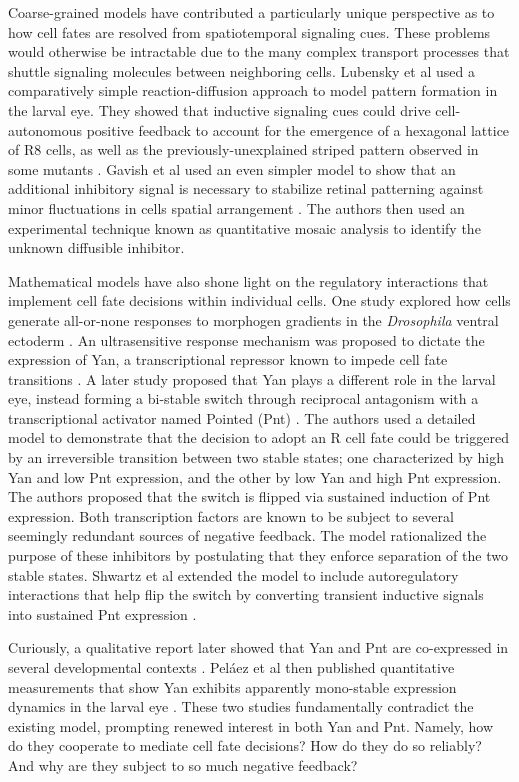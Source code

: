 Coarse-grained models have contributed a particularly unique perspective as to how cell fates are resolved from spatiotemporal signaling cues. These problems would otherwise be intractable due to the many complex transport processes that shuttle signaling molecules between neighboring cells. Lubensky et al used a comparatively simple reaction-diffusion approach to model pattern formation in the larval eye. They showed that inductive signaling cues could drive cell-autonomous positive feedback to account for the emergence of a hexagonal lattice of R8 cells, as well as the previously-unexplained striped pattern observed in some mutants \cite{Lubensky2011}. Gavish et al used an even simpler model to show that an additional inhibitory signal is necessary to stabilize retinal patterning against minor fluctuations in cells spatial arrangement \cite{Gavish2016}. The authors then used an experimental technique known as quantitative mosaic analysis to identify the unknown diffusible inhibitor.

Mathematical models have also shone light on the regulatory interactions that implement cell fate decisions within individual cells. One study explored how cells generate all-or-none responses to morphogen gradients in the \textit{Drosophila} ventral ectoderm \cite{Melen2005}. An ultrasensitive response mechanism was proposed to dictate the expression of Yan, a transcriptional repressor known to impede cell fate transitions \cite{Lai1992,Rogge1995,Rebay1995}. A later study proposed that Yan plays a different role in the larval eye, instead forming a bi-stable switch through reciprocal antagonism with a transcriptional activator named Pointed (Pnt) \cite{Graham2010}. The authors used a detailed model to demonstrate that the decision to adopt an R cell fate could be triggered by an irreversible transition between two stable states; one characterized by high Yan and low Pnt expression, and the other by low Yan and high Pnt expression. The authors proposed that the switch is flipped via sustained induction of Pnt expression. Both transcription factors are known to be subject to several seemingly redundant sources of negative feedback. The model rationalized the purpose of these inhibitors by postulating that they enforce separation of the two stable states. Shwartz et al extended the model to include autoregulatory interactions that help flip the switch by converting transient inductive signals into sustained Pnt expression \cite{Shwartz2013}. 

Curiously, a qualitative report later showed that Yan and Pnt are co-expressed in several developmental contexts \cite{BoisclairLachance2014}. Pel\'{a}ez et al then published quantitative measurements that show Yan exhibits apparently mono-stable expression dynamics in the larval eye \cite{Pelaez2015}. These two studies fundamentally contradict the existing model, prompting renewed interest in both Yan and Pnt. Namely, how do they cooperate to mediate cell fate decisions? How do they do so reliably? And why are they subject to so much negative feedback?

